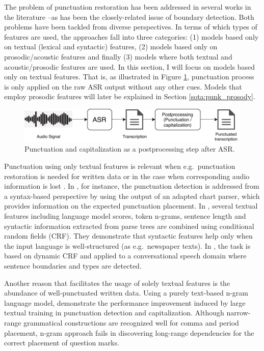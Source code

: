 The problem of punctuation restoration has been addressed in several works in the literature --as has been the closely-related issue of boundary detection. Both problems have been tackled from diverse perspectives. In terms of which types of features are used, the approaches fall into three categories: (1) models based only on textual (lexical and syntactic) features, (2) models based only on prosodic/acoustic features and finally (3) models where both textual and acoustic/prosodic features are used. In this section, I will focus on models based only on textual features. That is, as illustrated in Figure \ref{sota:figure:punc_on_text}, punctuation process is only applied on the raw ASR output without any other cues. Models that employ prosodic features will later be explained in Section \ref{sota:punk_prosody}.

\begin{figure}[t]
  \centering
  \includegraphics[width=\linewidth]{img/Punctuation_on_ASR_output.pdf}
  \caption{Punctuation and capitalization as a postprocessing step after ASR.}
  \label{sota:figure:punc_on_text}
\end{figure}

Punctuation using only textual features is relevant when e.g.~punctuation restoration is needed for written data \citep{jakubicek2010punctuation} or in the case when corresponding audio information is lost \citep{lu2010better}. In \cite{jakubicek2010punctuation}, for instance, the punctuation detection is addressed from a syntax-based perspective by using the output of an adapted chart parser, which provides information on the expected punctuation placement. In \cite{ueffing2013improved}, several textual features including language model scores, token n-grams, sentence length and syntactic information extracted from parse trees are combined using conditional random fields (CRF). They demonstrate that syntactic features help only when the input language is well-structured (as e.g.~newspaper texts). In \cite{lu2010better}, the task is based on dynamic CRF and applied to a conversational speech domain where sentence boundaries and types are detected. 

Another reason that facilitates the usage of solely textual features is the abundance of well-punctuated written data. Using a purely text-based n-gram language model, \cite{Gravano} demonstrate the performance improvement induced by large textual training in punctuation detection and capitalization. Although narrow-range grammatical constructions are recognized well for comma and period placement, n-gram approach fails in discovering long-range dependencies for the correct placement of question marks. 

